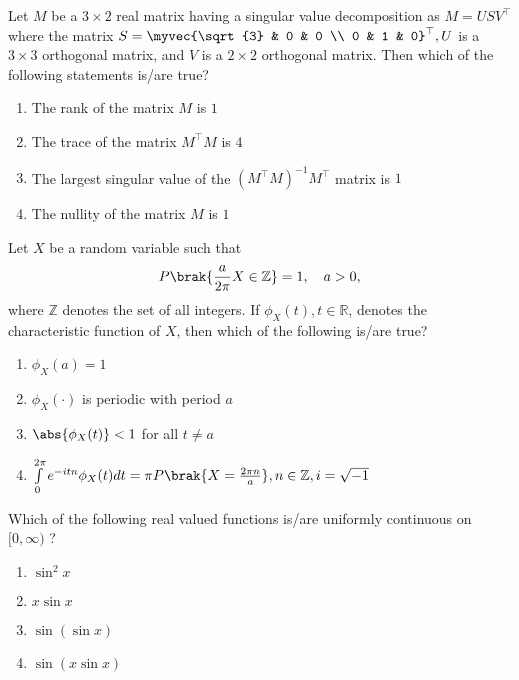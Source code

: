         \item Let $M$ be a $3 \times 2$ real matrix having a singular value decomposition as $M=USV^\top$ where the matrix $S = \myvec{\sqrt{3} & 0 & 0 \\ 0 & 1 & 0}^\top,U$ is a $3 \times 3$ orthogonal matrix, and $V$ is a $2 \times 2$ orthogonal matrix. Then which of the following statements is/are true?
            \begin{enumerate}
                \item The rank of the matrix $M$ is $1$
                \item The trace of the matrix $M^\top M$ is $4$
                \item The largest singular value of the $(M^\top M)^{-1}M^\top$ matrix is $1$
                \item The nullity of the matrix $M$ is $1$
            \end{enumerate}

        \item Let $X$ be a random variable such that $$P\brak{\frac{a}{2\pi}X \in \mathbb{Z}}=1,\quad a>0,$$ where $\mathbb{Z}$ denotes the set of all integers. If $\phi_{X}(t),t\in\mathbb{R}$, denotes the characteristic function of $X$, then which of the following is/are true?
            \begin{enumerate}
                \item $\phi_{X}(a) = 1$
                \item $\phi_{X}(\cdot)$ is periodic with period $a$
                \item $\abs{\phi_{X}(t)}<1$ for all $t \neq a$
                \item $\int\limits_0^{2\pi}e^{-itn}\phi_{X}(t)dt = \pi P\brak{X=\frac{2\pi n}{a}}, n\in\mathbb{Z}, i=\sqrt{-1}$
            \end{enumerate}

        \item Which of the following real valued functions is/are uniformly continuous on $[0,\infty)$ ?
            \begin{enumerate}
                \item $\sin^2{x}$
                \item $x\sin{x}$
                \item $\sin{(\sin{x})}$
                \item $\sin{(x\sin{x})}$
            \end{enumerate}

